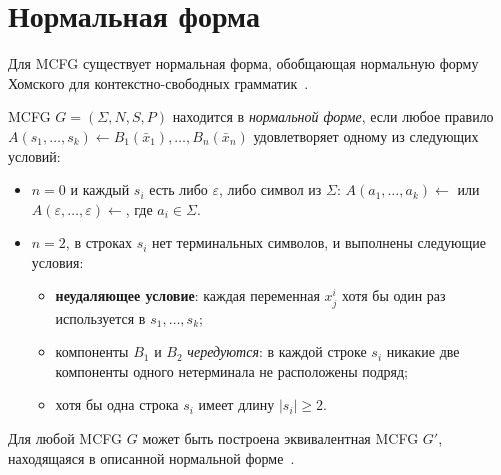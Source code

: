\section{Нормальная форма}
\label{sec:MCFGNormalForm}


Для MCFG существует нормальная форма, обобщающая нормальную форму Хомского для контекстно-свободных грамматик~.

\begin{definition}
    MCFG $G = (\Sigma, N, S, P)$ находится в \emph{нормальной форме},
    если любое правило $A(s_1,\ldots,s_k) \leftarrow B_1(\bar x_1),\ldots,B_n(\bar x_n)$
    удовлетворяет одному из следующих условий:
    \begin{itemize}
        \item $n = 0$ и каждый $s_i$ есть либо $\varepsilon$, либо символ из $\Sigma$:
              $A(a_1,\ldots,a_k) \leftarrow$ или $A(\varepsilon,\ldots,\varepsilon) \leftarrow$,
              где $a_i \in \Sigma$.
        \item $n = 2$, в строках $s_i$ нет терминальных символов,
              и выполнены следующие условия:
              \begin{itemize}
                  \item \textbf{неудаляющее условие}: каждая переменная $x^i_j$
                        хотя бы один раз используется в $s_1,\ldots,s_k$;
                  \item компоненты $B_1$ и $B_2$ \emph{чередуются}: в каждой строке $s_i$
                        никакие две компоненты одного нетерминала не расположены подряд;
                  \item хотя бы одна строка $s_i$ имеет длину $|s_i| \ge 2$.
              \end{itemize}
    \end{itemize}
\end{definition}

\begin{theorem}\label{thm:mcfg_normal_form}
    Для любой MCFG $G$ может быть построена эквивалентная MCFG $G'$,
    находящаяся в описанной нормальной форме~.
\end{theorem}

